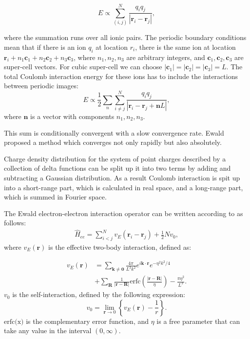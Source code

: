 \documentclass[twoside,english]{uiofysmaster}
\begin{document}
\begin{equation}
E \propto \sum_{(i , j)}^N \frac{q_i q_j}{|\mathbf{r}_i-\mathbf{r}_j|},
\end{equation}  

where the summation runs over all ionic pairs. The periodic boundary conditions mean that if there is an ion $q_i$ at location $r_i$, there is the same ion at location $\mathbf{r}_i + n_1\mathbf{c}_1 + n_2\mathbf{c}_2 +n_3\mathbf{c}_3$, where $n_1, n_2, n_3$ are arbitrary integers, and $\mathbf{c}_1, \mathbf{c}_2, \mathbf{c}_3$ are super-cell vectors.
For cubic super-cell we can choose $|\mathbf{c}_1| = |\mathbf{c}_2| = |\mathbf{c}_3| = L$.
The total Coulomb interaction energy for these ions has to include the interactions between periodic images:
\begin{equation}
E \propto \frac{1}{2}\sum_n \sum_{i \neq j}^N \frac{q_i q_j}{|\mathbf{r}_i-\mathbf{r}_j + \mathbf{n}L|},
\end{equation} 
where $\mathbf{n}$ is a vector with components $n_1, n_2, n_3$.

This sum is conditionally convergent with a slow convergence rate. Ewald proposed a method\cite{EwaldBerechnungoptischerund1921} which converges not only rapidly but also absolutely.

Charge density distribution for the system of point charges described by
a collection of delta functions can be split up it into two terms by adding and subtracting a Gaussian distribution. As a result Coulomb interaction is spit up into a short-range part, which is calculated in real space, and a long-range part, which is summed in Fourier space.


The Ewald electron-electron interaction operator can be written according to \cite{EwaldBerechnungoptischerund1921} as follows:
\begin{align}
\hat{H}_{ee} = \sum_{i < j}^{N} v_{E}\left( \mathbf{r}_{i}-\mathbf{r}_{j}\right)
+ \frac{1}{2}Nv_{0},
\end{align}
where $v_{E}(\mathbf{r})$  is the effective two-body interaction, defined as:

 \begin{align}\label{selfinter}
 v_{E}(\mathbf{r}) &= \sum_{\mathbf{k} \neq \mathbf{0}}
 \frac{4\pi }{L^{3}k^{2}}e^{i\mathbf{k}\cdot \mathbf{r}}
 e^{-\eta^{2}k^{2}/4} \nonumber \\
 &+ \sum_{\mathbf{R}}\frac{1}{\left| \mathbf{r}
 	-\mathbf{R}\right| } \mathrm{erfc} \left( \frac{\left| 
 	\mathbf{r}-\mathbf{R}\right|}{\eta }\right)
 - \frac{\pi \eta^{2}}{L^{3}}.
 \end{align}
$v_{0}$ is the self-interaction, defined by the following expression: 
\begin{equation}
v_{0} = \lim_{\mathbf{r} \rightarrow 0} \left\{ v_{E}(\mathbf{r}) - \frac{1}{r} \right\}.
\end{equation}
$\text{erfc(x)}$ is the complementary error function, and $\eta$ is a free parameter that can take any value in the interval $(0,\infty)$. 
\end{document}
